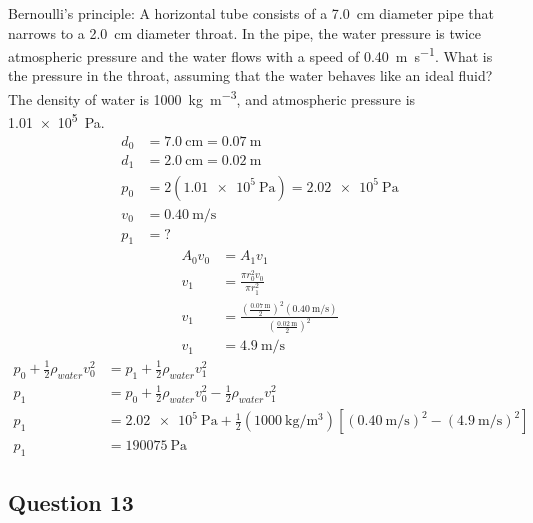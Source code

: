 \documentclass{article}
\begin{document}
Bernoulli's principle: A horizontal tube consists of a \SI{7.0}{\centi \meter} diameter pipe that narrows to a \SI{2.0}{\centi \meter} diameter throat. In the pipe, the water pressure is twice atmospheric pressure and the water flows with a speed of \SI{0.40}{\meter \per \second}. What is the pressure in the throat, assuming that the water behaves like an ideal fluid? The density of water is \SI{1000}{\kilogram \per \meter \cubed}, and atmospheric pressure is \SI{1.01e5}{\pascal}.
\begin{align*}
	d_0 & = \SI{7.0}{\centi \meter} = \SI{0.07}{\meter} \\
	d_1 & = \SI{2.0}{\centi \meter} = \SI{0.02}{\meter} \\
	p_0 & = 2(\SI{1.01e5}{\pascal}) = \SI{2.02e5}{\pascal} \\
	v_0 & = \SI{0.40}{\meter \per \second} \\
	p_1 & = ?
\end{align*}
\begin{align*}
	A_0v_0 & = A_1v_1 \\
	v_1 & = \frac{ \pi r_0^2v_0 }{ \pi r_1^2 } \\
	v_1 & = \frac{ \left( \frac{ \SI{0.07}{\meter} }{ 2 } \right)^2 (\SI{0.40}{\meter \per \second}) }{ \left( \frac{ \SI{0.02}{\meter} }{ 2 } \right)^2 } \\
	v_1 & = \SI{4.9}{\meter \per \second}
\end{align*}
\begin{align*}
	p_0 + \frac{1}{2}\rho_{water}v_0^2 & = p_1 + \frac{1}{2}\rho_{water}v_1^2 \\
	p_1 & = p_0 + \frac{1}{2}\rho_{water}v_0^2 - \frac{1}{2}\rho_{water}v_1^2 \\
	p_1 & = \SI{2.02e5}{\pascal} + \frac{1}{2}(\SI{1000}{\kilogram \per \meter \cubed}) \left[ (\SI{0.40}{\meter \per \second})^2 - (\SI{4.9}{\meter \per \second})^2 \right] \\
	p_1 & = \SI{190075}{\pascal}
\end{align*}

\subsection{Question 13}
\end{document}
